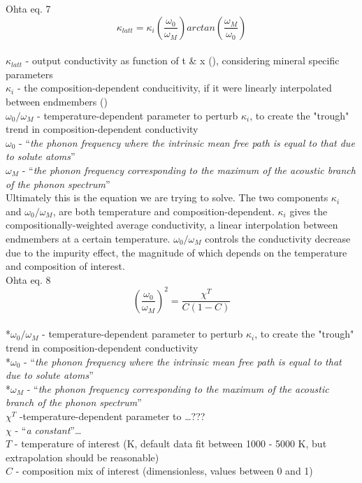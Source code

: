 Ohta eq. 7 
\begin{equation}%
\kappa_{latt}=\kappa_{i}\left ( \frac{\omega_{0}}{\omega_{M}} \right )arctan\left ( \frac{\omega_{M}}{\omega_{0}} \right )
\label{eq.ohta7}
\end{equation}%
\\ $\kappa_{latt}$ - output conductivity as function of t \& x (\wmk), considering mineral specific parameters\\
$\kappa_{i}$ - the composition-dependent conducitivity, if it were linearly interpolated between endmembers (\wmk)\\
$\omega_{0}/\omega_{M}$ - temperature-dependent parameter to perturb $\kappa_{i}$, to create the "trough" trend in composition-dependent conductivity\\
$\omega_{0}$ - \enquote{\textit{the phonon frequency where the intrinsic mean free path is equal to that due to solute atoms}}\\
$\omega_{M}$ - \enquote{\textit{the phonon frequency corresponding to the maximum of the acoustic branch of the phonon spectrum}}\\

Ultimately this is the equation we are trying to solve. The two components $\kappa_{i}$ and $\omega_{0}/\omega_{M}$, are both temperature and composition-dependent. $\kappa_{i}$ gives the compositionally-weighted average conductivity, a linear interpolation between endmembers at a certain temperature. $\omega_{0}/\omega_{M}$ controls the conductivity decrease due to the impurity effect, the magnitude of which depends on the temperature and composition of interest.\\

Ohta eq. 8 
\begin{equation}%
\left ( \frac{\omega_{0}}{\omega_{M}} \right )^{2}=\frac{\chi^{T}}{C\left ( 1-C \right )}  
\label{eq.ohta8}
\end{equation}%
\\ *$\omega_{0}/\omega_{M}$ - temperature-dependent parameter to perturb $\kappa_{i}$, to create the "trough" trend in composition-dependent conductivity\\
*$\omega_{0}$ - \enquote{\textit{the phonon frequency where the intrinsic mean free path is equal to that due to solute atoms}}\\
*$\omega_{M}$ - \enquote{\textit{the phonon frequency corresponding to the maximum of the acoustic branch of the phonon spectrum}}\\
$\chi^{T}$ -temperature-dependent parameter to \dots ??? \\
$\chi$ - \enquote{\textit{a constant}}\dots\\
$T$ - temperature of interest (K, default data fit between 1000 - 5000 K, but extrapolation should be reasonable)\\                    
$C$ - composition mix of interest (dimensionless, values between 0 and 1)\\

